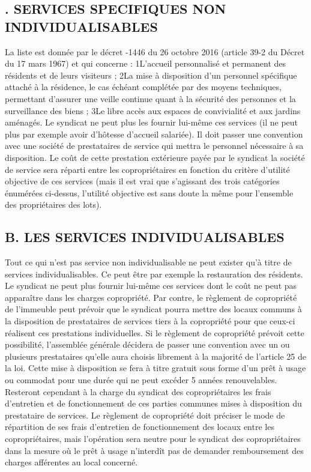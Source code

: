 	\subsection{. SERVICES SPECIFIQUES NON INDIVIDUALISABLES}
	
		La liste est donnée par le décret -1446 du 26 octobre 2016 (article 39-2 du Décret du 17 mars 1967) et qui concerne :
		1\degres L'accueil personnalisé et permanent des résidents et de leurs visiteurs ; 2\degres La mise à disposition d'un personnel spécifique attaché à la résidence, le cas échéant complétée par des moyens techniques, permettant d'assurer une veille continue quant à la sécurité des personnes et la surveillance des biens ; 3\degres Le libre accès aux espaces de convivialité et aux jardins aménagés.
		Le syndicat ne peut plus les fournir lui-même ces services (il ne peut plus par exemple avoir d’hôtesse d’accueil salariée). Il doit passer une convention avec une société de prestataires de service qui mettra le personnel nécessaire à sa disposition. Le coût de cette prestation extérieure payée par le syndicat la société de service sera réparti entre les copropriétaires en fonction du critère d’utilité objective de ces services (mais il est vrai que s’agissant des trois catégories énumérées ci-dessus, l’utilité objective est sans doute la même pour l’ensemble des propriétaires des lots).
	
	\subsection{B. LES SERVICES INDIVIDUALISABLES}
	
		Tout ce qui n’est pas service non individualisable ne peut exister qu’à titre de services individualisables. Ce peut être par exemple la restauration des résidents.
		Le syndicat ne peut plus fournir lui-même ces services dont le coût ne peut pas apparaître dans les charges copropriété.
		Par contre, le règlement de copropriété de l’immeuble peut prévoir que le syndicat pourra mettre des locaux communs à la disposition de prestataires de services tiers à la copropriété pour que ceux-ci réalisent ces prestations individuelles.
		Si le règlement de copropriété prévoit cette possibilité, l’assemblée générale décidera de passer une convention avec un ou plusieurs prestataires qu’elle aura choisis librement à la majorité de l’article 25 de la loi.
		Cette mise à disposition se fera à titre gratuit sous forme d’un prêt à usage ou commodat pour une durée qui ne peut excéder 5 années renouvelables.
		Resteront cependant à la charge du syndicat des copropriétaires les frais d’entretien et de fonctionnement de ces parties communes mises à disposition du prestataire de services. Le règlement de copropriété doit préciser le mode de répartition de ses frais d’entretien de fonctionnement des locaux entre les copropriétaires, mais l’opération sera neutre pour le syndicat des copropriétaires dans la mesure où le prêt à usage n’interdît pas de demander remboursement des charges afférentes au local concerné.
		

